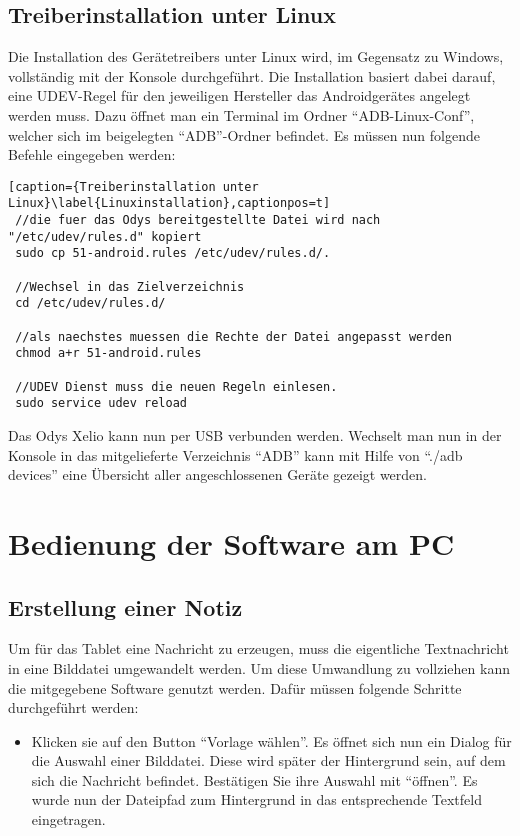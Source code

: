 \begin{flushleft}
\subsection{Treiberinstallation unter Linux}
Die Installation des Gerätetreibers unter Linux wird, im Gegensatz zu Windows, vollständig mit der Konsole durchgeführt. Die Installation basiert dabei darauf, eine UDEV-Regel für den jeweiligen Hersteller das Androidgerätes angelegt werden muss. Dazu öffnet man ein Terminal im Ordner ``ADB-Linux-Conf'', welcher sich im beigelegten ``ADB''-Ordner befindet. Es müssen nun folgende Befehle eingegeben werden:
 \begin{lstlisting}[caption={Treiberinstallation unter Linux}\label{Linuxinstallation},captionpos=t] 
 //die fuer das Odys bereitgestellte Datei wird nach "/etc/udev/rules.d" kopiert
 sudo cp 51-android.rules /etc/udev/rules.d/.
 
 //Wechsel in das Zielverzeichnis
 cd /etc/udev/rules.d/
 
 //als naechstes muessen die Rechte der Datei angepasst werden
 chmod a+r 51-android.rules
 
 //UDEV Dienst muss die neuen Regeln einlesen. 
 sudo service udev reload
 \end{lstlisting}

 Das Odys Xelio kann nun per USB verbunden werden. Wechselt man nun in der Konsole in das mitgelieferte Verzeichnis ``ADB'' kann mit Hilfe von ``./adb devices'' eine Übersicht aller angeschlossenen Geräte gezeigt werden. 
 
\section{Bedienung der Software am PC}
\subsection{Erstellung einer Notiz}
Um für das Tablet eine Nachricht zu erzeugen, muss die eigentliche Textnachricht in eine Bilddatei umgewandelt werden. Um diese Umwandlung zu vollziehen kann die mitgegebene Software genutzt werden. Dafür müssen folgende Schritte durchgeführt werden:
\begin{itemize}
  \item Klicken sie auf den Button ``Vorlage wählen''.
    \subitem Es öffnet sich nun ein Dialog für die Auswahl einer Bilddatei. Diese wird später der Hintergrund sein, auf dem sich die 			 Nachricht befindet. Bestätigen Sie ihre Auswahl mit ``öffnen''.
    \subitem Es wurde nun der Dateipfad zum Hintergrund in das entsprechende Textfeld eingetragen. 
    

\end{itemize}
\end{flushleft}
